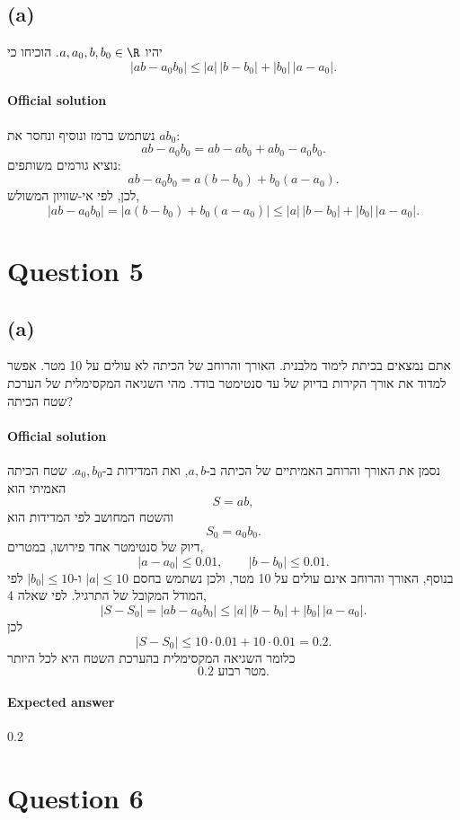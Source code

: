 \documentclass[12pt]{article}
\begin{document}
\subsection*{(a)}
יהיו \(a,a_0,b,b_0\in\R\). הוכיחו כי
\[
|ab-a_0b_0|\le |a|\,|b-b_0|+|b_0|\,|a-a_0|.
\]

\paragraph{Official solution}
נשתמש ברמז ונוסיף ונחסר את \(ab_0\):
\[
ab-a_0b_0=ab-ab_0+ab_0-a_0b_0.
\]
נוציא גורמים משותפים:
\[
ab-a_0b_0=a(b-b_0)+b_0(a-a_0).
\]
לכן, לפי אי-שוויון המשולש,
\[
|ab-a_0b_0|
=|a(b-b_0)+b_0(a-a_0)|
\le |a|\,|b-b_0|+|b_0|\,|a-a_0|.
\]


\section*{Question 5}

\subsection*{(a)}
אתם נמצאים בכיתת לימוד מלבנית. האורך והרוחב של הכיתה לא עולים על 10 מטר. אפשר למדוד את אורך הקירות בדיוק של עד סנטימטר בודד. מהי השגיאה המקסימלית של הערכת שטח הכיתה?

\paragraph{Official solution}
נסמן את האורך והרוחב האמיתיים של הכיתה ב-\(a,b\), ואת המדידות ב-\(a_0,b_0\). שטח הכיתה האמיתי הוא
\[
S=ab,
\]
והשטח המחושב לפי המדידות הוא
\[
S_0=a_0b_0.
\]
דיוק של סנטימטר אחד פירושו, במטרים,
\[
|a-a_0|\le 0.01,\qquad |b-b_0|\le 0.01.
\]
בנוסף, האורך והרוחב אינם עולים על 10 מטר, ולכן נשתמש בחסם \(|a|\le 10\) ו-\(|b_0|\le 10\) לפי המודל המקובל של התרגיל. לפי שאלה 4,
\[
|S-S_0|=|ab-a_0b_0|
\le |a|\,|b-b_0|+|b_0|\,|a-a_0|.
\]
לכן
\[
|S-S_0|\le 10\cdot 0.01+10\cdot 0.01=0.2.
\]
כלומר השגיאה המקסימלית בהערכת השטח היא לכל היותר
\[
\boxed{0.2\text{ מטר רבוע}}.
\]

\paragraph{Expected answer}
0.2


\section*{Question 6}
\end{document}
